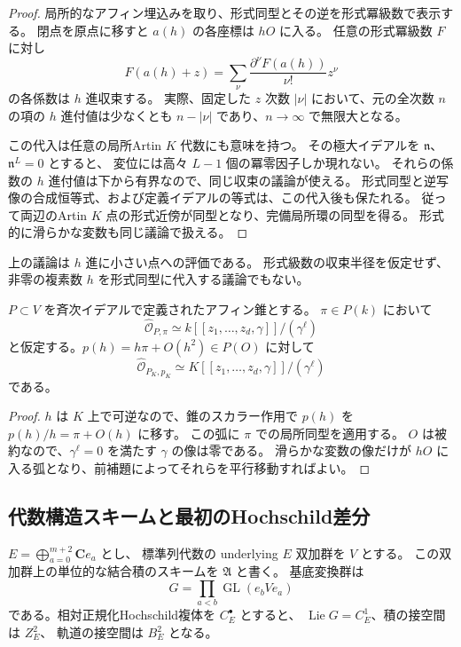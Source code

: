 \begin{proof}
局所的なアフィン埋込みを取り、形式同型とその逆を形式冪級数で表示する。
閉点を原点に移すと $a(h)$ の各座標は $hO$ に入る。
任意の形式冪級数 $F$ に対し
\[
 F(a(h)+z)=\sum_{\nu}
       \frac{\partial^\nu F(a(h))}{\nu!}z^\nu
\]
の各係数は $h$ 進収束する。
実際、固定した $z$ 次数 $|\nu|$ において、元の全次数 $n$ の項の
$h$ 進付値は少なくとも $n-|\nu|$ であり、$n\to\infty$ で無限大となる。

この代入は任意の局所Artin $K$ 代数にも意味を持つ。
その極大イデアルを $\mathfrak n$、$\mathfrak n^L=0$ とすると、
変位には高々 $L-1$ 個の冪零因子しか現れない。
それらの係数の $h$ 進付値は下から有界なので、同じ収束の議論が使える。
形式同型と逆写像の合成恒等式、および定義イデアルの等式は、この代入後も保たれる。
従って両辺のArtin $K$ 点の形式近傍が同型となり、完備局所環の同型を得る。
形式的に滑らかな変数も同じ議論で扱える。
\end{proof}

\begin{remark}
上の議論は $h$ 進に小さい点への評価である。
形式級数の収束半径を仮定せず、非零の複素数 $h$ を形式同型に代入する議論でもない。
\end{remark}

\begin{lemma}[斉次錐と太い滑らかな枝]
\label{lem:cone-arc-v35}
$P\subset V$ を斉次イデアルで定義されたアフィン錐とする。
$\pi\in P(k)$ において
\[
 \widehat{\mathcal O}_{P,\pi}
       \simeq k[[z_1,\ldots,z_d,\gamma]]/(\gamma^\ell)
\]
と仮定する。$p(h)=h\pi+O(h^2)\in P(O)$ に対して
\[
 \widehat{\mathcal O}_{P_K,p_K}
       \simeq K[[z_1,\ldots,z_d,\gamma]]/(\gamma^\ell)
\]
である。
\end{lemma}

\begin{proof}
$h$ は $K$ 上で可逆なので、錐のスカラー作用で $p(h)$ を
$p(h)/h=\pi+O(h)$ に移す。
この弧に $\pi$ での局所同型を適用する。
$O$ は被約なので、$\gamma^\ell=0$ を満たす $\gamma$ の像は零である。
滑らかな変数の像だけが $hO$ に入る弧となり、前補題によってそれらを平行移動すればよい。
\end{proof}

\subsection{代数構造スキームと最初のHochschild差分}

$E=\bigoplus_{a=0}^{m+2}\mathbf C e_a$ とし、
標準列代数の underlying $E$ 双加群を $V$ とする。
この双加群上の単位的な結合積のスキームを $\mathfrak A$ と書く。
基底変換群は
\[
 G=\prod_{a<b}\operatorname{GL}(e_bVe_a)
\]
である。相対正規化Hochschild複体を $C_E^\bullet$ とすると、
$\operatorname{Lie}G=C_E^1$、積の接空間は $Z_E^2$、
軌道の接空間は $B_E^2$ となる。

